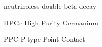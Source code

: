 \begin{glossary}
\item[\znbb] neutrinoless double-beta decay
\item[HPGe] High Purity Germanium
\item[PPC] P-type Point Contact
 
\end{glossary}
